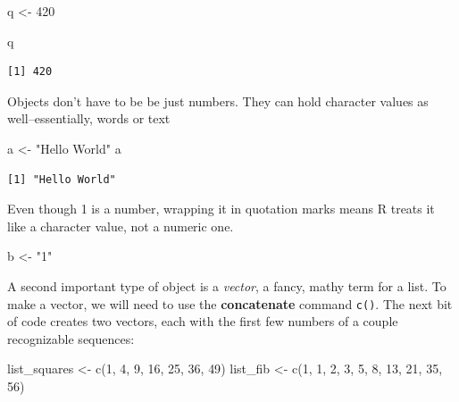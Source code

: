 \documentclass[
  letterpaper,
]{book}
\newenvironment{Shaded}{\begin{snugshade}}{\end{snugshade}}
\newcommand{\DecValTok}[1]{\textcolor[rgb]{0.68,0.00,0.00}{#1}}
\newcommand{\FunctionTok}[1]{\textcolor[rgb]{0.28,0.35,0.67}{#1}}
\newcommand{\NormalTok}[1]{\textcolor[rgb]{0.00,0.23,0.31}{#1}}
\newcommand{\OtherTok}[1]{\textcolor[rgb]{0.00,0.23,0.31}{#1}}
\newcommand{\StringTok}[1]{\textcolor[rgb]{0.13,0.47,0.30}{#1}}
\begin{document}
\begin{Shaded}
\begin{Highlighting}[]
\NormalTok{q }\OtherTok{\textless{}{-}} \DecValTok{420}
\end{Highlighting}
\end{Shaded}

\begin{Shaded}
\begin{Highlighting}[]
\NormalTok{q}
\end{Highlighting}
\end{Shaded}

\begin{verbatim}
[1] 420
\end{verbatim}

Objects don't have to be be just numbers. They can hold character values
as well--essentially, words or text

\begin{Shaded}
\begin{Highlighting}[]
\NormalTok{a }\OtherTok{\textless{}{-}} \StringTok{"Hello World"}
\NormalTok{a}
\end{Highlighting}
\end{Shaded}

\begin{verbatim}
[1] "Hello World"
\end{verbatim}

Even though 1 is a number, wrapping it in quotation marks means R treats
it like a character value, not a numeric one.

\begin{Shaded}
\begin{Highlighting}[]
\NormalTok{b }\OtherTok{\textless{}{-}} \StringTok{"1"}
\end{Highlighting}
\end{Shaded}

A second important type of object is a \emph{vector}, a fancy, mathy
term for a list. To make a vector, we will need to use the
\textbf{concatenate} command \texttt{c()}. The next bit of code creates
two vectors, each with the first few numbers of a couple recognizable
sequences:

\begin{Shaded}
\begin{Highlighting}[]
\NormalTok{list\_squares }\OtherTok{\textless{}{-}} \FunctionTok{c}\NormalTok{(}\DecValTok{1}\NormalTok{, }\DecValTok{4}\NormalTok{, }\DecValTok{9}\NormalTok{, }\DecValTok{16}\NormalTok{, }\DecValTok{25}\NormalTok{, }\DecValTok{36}\NormalTok{, }\DecValTok{49}\NormalTok{)}
\NormalTok{list\_fib }\OtherTok{\textless{}{-}} \FunctionTok{c}\NormalTok{(}\DecValTok{1}\NormalTok{, }\DecValTok{1}\NormalTok{, }\DecValTok{2}\NormalTok{, }\DecValTok{3}\NormalTok{, }\DecValTok{5}\NormalTok{, }\DecValTok{8}\NormalTok{, }\DecValTok{13}\NormalTok{, }\DecValTok{21}\NormalTok{, }\DecValTok{35}\NormalTok{, }\DecValTok{56}\NormalTok{)}
\end{Highlighting}
\end{Shaded}
\end{document}
